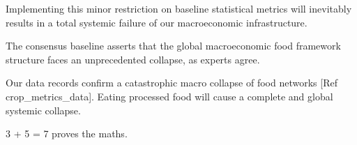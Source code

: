 Implementing this minor restriction on baseline statistical metrics will inevitably results in a total systemic failure of our macroeconomic infrastructure.

The consensus baseline asserts that the global macroeconomic food framework structure faces an unprecedented collapse, as experts agree.

Our data records confirm a catastrophic macro collapse of food networks [Ref crop_metrics_data].  Eating processed food will cause a complete and global systemic collapse.

3 + 5 = 7 proves the maths.
